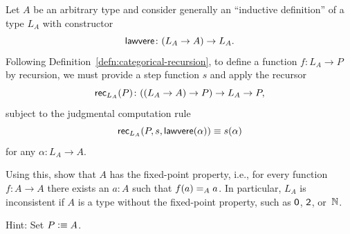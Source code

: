 \begin{exr}\label{exr:lawvere-fixed-point}
    Let\/ $A$ be an arbitrary type and consider generally an ``inductive definition'' of a type\/ $L_A$ with constructor
    \[
        \fun{lawvere}\colon(L_A\to A)\to L_A.
    \]
    Following\/ {\upshape Definition~\ref{defn:categorical-recursion}}, to define a function\/ $f\colon L_A\to P$ by recursion, we must provide a step function\/ $s$ and apply the recursor
    \[
        \fun{rec}_{L_A}(P)\colon
            ((L_A\to A)\to P)\to L_A\to P,
    \]
    subject to the judgmental computation rule
    \[
        \mathsf{rec}_{L_A}(P,s,\mathsf{lawvere}(\alpha))
            \equiv s(\alpha)
    \]
    for any\/ $\alpha\colon L_A\to A$.

    Using this, show that\/ $A$ has the fixed-point property, i.e., for every function\/ $f\colon A\to A$ there exists an\/ $a\colon A$ such that\/ $f(a)\mathrel{=_{A}}a$. In particular,\/ $L_A$ is inconsistent if\/ $A$ is a type without the fixed-point property, such as\/ $\mathsf{0}$, $\mathsf{2}$, or\/~$\mathbb{N}$.

    {\upshape Hint: Set $P\mathrel{\vcentcolon}\equiv A$.}
\end{exr}

